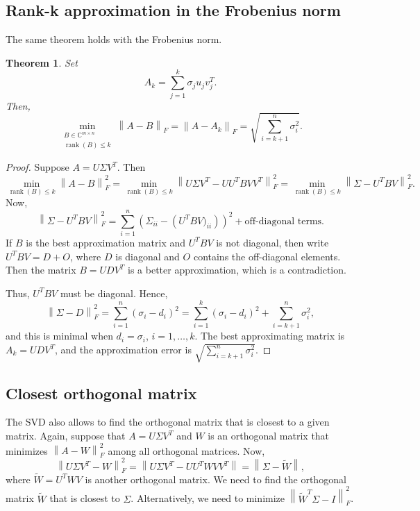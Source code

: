 \documentclass{article}
\newcommand{\norm}[1]{\left \lVert #1 \right \rVert}
\newtheorem{theorem}{Theorem}[section]
\begin{document}
\subsection{Rank-k approximation in the Frobenius norm}

The same theorem holds with the Frobenius norm.
\begin{theorem} Set
\begin{equation*}
A_{k} = \sum_{j=1}^{k} \sigma_{j} u_{j} v_{j}^{T}.
\end{equation*}
Then,
\begin{equation*}
\min_{\substack{B \in \mathbb{C}^{m \times n} \\
\operatorname{rank}(B) \leq k}} \norm{A-B}_{F} = \norm{A-A_{k}}_{F}
= \sqrt{\sum_{i=k+1}^{n} \sigma_{i}^{2}}.
\end{equation*}
\end{theorem}
\begin{proof}
Suppose $A=U \Sigma V^{T}$. Then
\begin{equation*}
\min_{\operatorname{rank}(B) \leq k} \norm{A-B}^{2}_{F} =
\min_{\operatorname{rank}(B) \leq k} \norm{U \Sigma V^{T} - UU^{T} B
VV^{T}}^{2}_{F} = \min_{\operatorname{rank}(B) \leq k} \norm{\Sigma
- U^{T} B V}^{2}_{F}.
\end{equation*}
Now,
\begin{equation*}
\norm{\Sigma - U^{T} B V}^{2}_{F} = \sum_{i=1}^{n} \left (
\Sigma_{ii} - \left (U^{T}B V)_{ii} \right ) \right )^{2} +
\text{off-diagonal terms}.
\end{equation*}
If $B$ is the best approximation matrix and $U^{T}B V$ is not
diagonal, then write $U^{T}B V=D+O$, where $D$ is diagonal and $O$
contains the off-diagonal elements. Then the matrix $B = U D V^{T}$
is a better approximation, which is a contradiction.

Thus, $U^{T}B V$ must be diagonal. Hence,
\begin{equation*}
\norm{\Sigma - D}^{2}_{F} = \sum_{i=1}^{n} \left (\sigma_{i} - d_{i}
\right )^{2} = \sum_{i=1}^{k} \left (\sigma_{i} - d_{i} \right )^{2}
+ \sum_{i=k+1}^{n} \sigma_{i}^{2},
\end{equation*}
and this is minimal when $d_{i}=\sigma_{i}$, $i=1,\ldots,k$. The
best approximating matrix is $A_{k} = U D V^{T}$, and the
approximation error is $\sqrt{\sum_{i=k+1}^{n} \sigma_{i}^{2}}$.
\end{proof}


\subsection{Closest orthogonal matrix}
The SVD also allows to find the orthogonal matrix that is closest to
a given matrix. Again, suppose that $A = U \Sigma V^{T}$ and $W$ is
an orthogonal matrix that minimizes $\norm{A-W}^{2}_{F}$ among all
orthogonal matrices. Now,
\begin{equation*}
\norm{U \Sigma V^{T} - W}_{F}^{2} = \norm{U \Sigma V^{T} - UU^{T} W
VV^{T}} = \norm{\Sigma - \tilde{W}},
\end{equation*}
where $\tilde{W}=U^{T} W V$ is another orthogonal matrix. We need to
find the orthogonal matrix $\tilde{W}$ that is closest to $\Sigma$.
Alternatively, we need to minimize $\norm{\tilde{W}^{T} \Sigma -
I}_{F}^{2}$.
\end{document}

